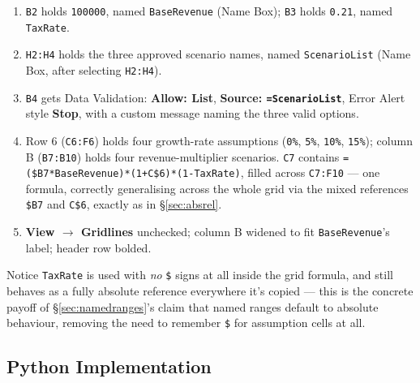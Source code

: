 \documentclass[11pt,a4paper]{article}
\begin{document}
\begin{enumerate}
  \item \texttt{B2} holds \texttt{100000}, named \texttt{BaseRevenue} (Name Box); \texttt{B3} holds \texttt{0.21}, named \texttt{TaxRate}.
  \item \texttt{H2:H4} holds the three approved scenario names, named \texttt{ScenarioList} (Name Box, after selecting \texttt{H2:H4}).
  \item \texttt{B4} gets Data Validation: \textbf{Allow: List}, \textbf{Source: \texttt{=ScenarioList}}, Error Alert style \textbf{Stop}, with a custom message naming the three valid options.
  \item Row 6 (\texttt{C6:F6}) holds four growth-rate assumptions (\texttt{0\%}, \texttt{5\%}, \texttt{10\%}, \texttt{15\%}); column B (\texttt{B7:B10}) holds four revenue-multiplier scenarios. \texttt{C7} contains \texttt{=(\$B7*BaseRevenue)*(1+C\$6)*(1-TaxRate)}, filled across \texttt{C7:F10} --- one formula, correctly generalising across the whole grid via the mixed references \texttt{\$B7} and \texttt{C\$6}, exactly as in \S\ref{sec:absrel}.
  \item \textbf{View $\rightarrow$ Gridlines} unchecked; column B widened to fit \texttt{BaseRevenue}'s label; header row bolded.
\end{enumerate}

\begin{financeapp}
Notice \texttt{TaxRate} is used with \emph{no} \texttt{\$} signs at all inside the grid formula, and still behaves as a fully absolute reference everywhere it's copied --- this is the concrete payoff of \S\ref{sec:namedranges}'s claim that named ranges default to absolute behaviour, removing the need to remember \texttt{\$} for assumption cells at all.
\end{financeapp}

\subsection{Python Implementation}
\end{document}
